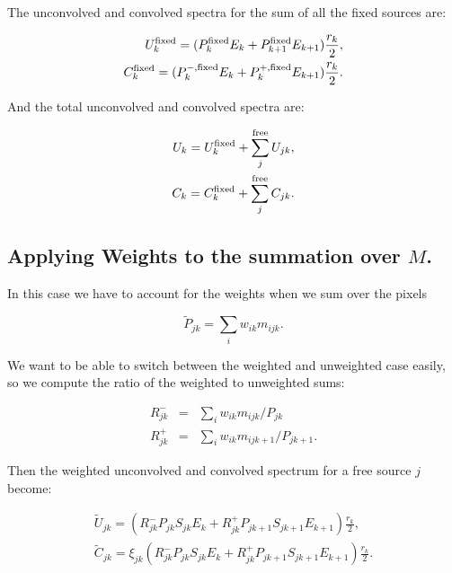 \documentclass[preprint]{aastex}
\begin{document}
\noindent The unconvolved and convolved spectra for the sum of
all the fixed sources are:

\begin{eqnarray}
  U_{k}^{\rm fixed} = ( P_{k}^{\rm fixed} E_k + P_{k+1}^{\rm fixed}  E_{k+1} ) \frac{r_k}{2},  \nonumber \\
  C_{k}^{\rm fixed} = ( P_{k}^{-, \rm fixed} E_k + P_{k}^{+, \rm fixed} E_{k+1} )  \frac{r_k}{2}.
\end{eqnarray}

\noindent And the total unconvolved and convolved spectra are:

\begin{eqnarray}
  U_{k} = U_{k}^{\rm fixed} + \sum_j^{\rm free} U_{jk}, \nonumber \\
  C_{k} = C_{k}^{\rm fixed} + \sum_j^{\rm free} C_{jk}.
\end{eqnarray}


\subsection{Applying Weights to the summation over \texorpdfstring{$M$}{M}.}\label{subsec:like_sum2_weights}

In this case we have to account for the weights when we sum over the
pixels

\begin{equation}
  \tilde{P}_{jk} = \sum_i w_{ik} m_{ijk}.
\end{equation}

\noindent We want to be able to switch between the weighted and
unweighted case easily, so we compute the ratio of the weighted to
unweighted sums:

\begin{eqnarray}
  R_{jk}^{-} & = & \sum_i w_{ik} m_{ijk} / P_{jk} \nonumber \\
  R_{jk}^{+} & = & \sum_i w_{ik} m_{ijk+1} / P_{jk+1}. 
\end{eqnarray}

\noindent Then the weighted unconvolved and convolved spectrum for a
free source $j$ become:

\begin{eqnarray}
  \tilde{U}_{jk} = ( R_{jk}^{-} P_{jk} S_{jk} E_k + R_{jk}^{+} P_{jk+1} S_{jk+1} E_{k+1} )  \frac{r_k}{2},  \nonumber \\
  \tilde{C}_{jk} = \xi_{jk} ( R_{jk}^{-} P_{jk} S_{jk} E_k + R_{jk}^{+} P_{jk+1} S_{jk+1} E_{k+1} ) \frac{r_k}{2}.
\end{eqnarray}
\end{document}
